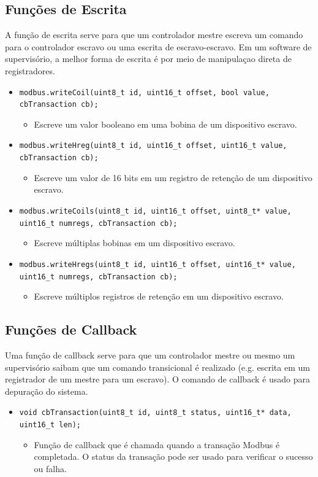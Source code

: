 \subsection{Funções de Escrita}
A função de escrita serve para que um controlador mestre escreva um comando para o controlador escravo ou uma escrita de escravo-escravo. Em um software de supervisório, a melhor forma de escrita é por meio de manipulaçao direta de registradores. 
\begin{itemize}
    \item \texttt{modbus.writeCoil(uint8\_t id, uint16\_t offset, bool value, cbTransaction cb);}
    \begin{itemize}
        \item Escreve um valor booleano em uma bobina de um dispositivo escravo.
    \end{itemize}
    \item \texttt{modbus.writeHreg(uint8\_t id, uint16\_t offset, uint16\_t value, cbTransaction cb);}
    \begin{itemize}
        \item Escreve um valor de 16 bits em um registro de retenção de um dispositivo escravo.
    \end{itemize}
    \item \texttt{modbus.writeCoils(uint8\_t id, uint16\_t offset, uint8\_t* value, uint16\_t numregs, cbTransaction cb);}
    \begin{itemize}
        \item Escreve múltiplas bobinas em um dispositivo escravo.
    \end{itemize}
    \item \texttt{modbus.writeHregs(uint8\_t id, uint16\_t offset, uint16\_t* value, uint16\_t numregs, cbTransaction cb);}
    \begin{itemize}
        \item Escreve múltiplos registros de retenção em um dispositivo escravo.
    \end{itemize}
\end{itemize}

\subsection{Funções de Callback}
Uma função de callback serve para que um controlador mestre ou mesmo um supervisório saibam que um comando transicional é realizado (e.g. escrita em um registrador de um mestre para um escravo). O comando de callback é usado para depuração do sistema.
\begin{itemize}
    \item \texttt{void cbTransaction(uint8\_t id, uint8\_t status, uint16\_t* data, uint16\_t len);}
    \begin{itemize}
        \item Função de callback que é chamada quando a transação Modbus é completada. O status da transação pode ser usado para verificar o sucesso ou falha.
    \end{itemize}
\end{itemize}

